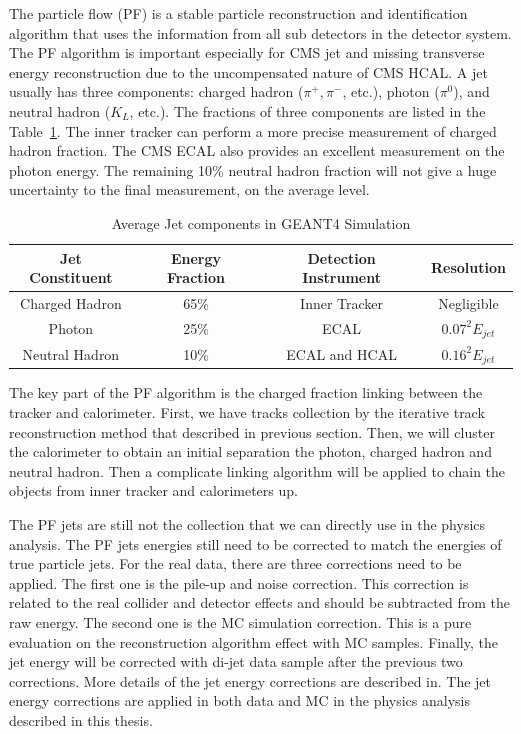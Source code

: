 The particle flow (PF) is a stable particle reconstruction and identification algorithm that uses the information from all sub detectors in the detector system. The PF algorithm is important especially for CMS jet and missing transverse energy reconstruction due to the uncompensated nature of CMS HCAL. A jet usually has three components: charged hadron ($\pi^{+},\pi^{-}$, etc.), photon ($\pi^{0}$), and neutral hadron ($K_{L}$, etc.). The fractions of three components are listed in the Table~\ref{tab:c3cmsjetf}. The inner tracker can perform a more precise measurement of charged hadron fraction. The CMS ECAL also provides an excellent measurement on the photon energy. The remaining 10\% neutral hadron fraction will not give a huge uncertainty to the final measurement, on the average level. 

\begin{table}[htbp]
\fontsize{10 pt}{1.2 em}
\selectfont
\begin{centering}
\caption{\label{tab:c3cmsjetf} Average Jet components in GEANT4 Simulation}
\hspace*{-4ex}
\begin{tabular}{|c|c|c|c|}
\hline
Jet Constituent & Energy Fraction & Detection Instrument & Resolution \\
\hline
Charged Hadron  & 65\% & Inner Tracker & Negligible \\
\hline
Photon          & 25\% & ECAL &  $0.07^{2}E_{jet}$ \\
\hline
Neutral Hadron  & 10\% & ECAL and HCAL & $0.16^{2}E_{jet}$ \\
\hline
\end{tabular}
\par\end{centering}
\end{table}

The key part of the PF algorithm is the charged fraction linking between the tracker and calorimeter. First, we have tracks collection by the iterative track reconstruction method that described in previous section. Then, we will cluster the calorimeter to obtain an initial separation the photon, charged hadron and neutral hadron. Then a complicate linking algorithm\cite{CMS-PAS-PFT-09-001} will be applied to chain the objects from inner tracker and calorimeters up. 

The PF jets are still not the collection that we can directly use in the physics analysis. The PF jets energies still need to be corrected to match the energies of true particle jets. For the real data, there are three corrections need to be applied. The first one is the pile-up and noise correction. This correction is related to the real collider and detector effects and should be subtracted from the raw energy. The second one is the MC simulation correction. This is a pure evaluation on the reconstruction algorithm effect with MC samples. Finally, the jet energy will be corrected with di-jet data sample after the previous two corrections. More details of the jet energy corrections are described in\cite{1748-0221-6-11-P11002}. The jet energy corrections are applied in both data and MC in the physics analysis described in this thesis. 

